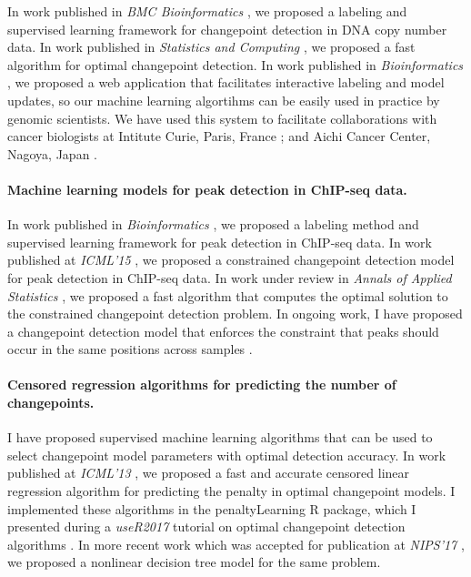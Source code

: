 \documentclass{article}
\begin{document}
In work published in \emph{BMC Bioinformatics}
\citep{HOCKING-breakpoints}, we proposed a labeling and supervised
learning framework for changepoint detection in DNA copy number data.
In work published in \emph{Statistics and Computing} \citep{fpop}, we
proposed a fast algorithm for optimal changepoint detection. In work
published in \emph{Bioinformatics} \citep{hocking-SegAnnDB}, we
proposed a web application that facilitates interactive labeling and
model updates, so our machine learning algortihms can be easily used
in practice by genomic scientists. We have used this system to
facilitate collaborations with cancer biologists at Intitute Curie,
Paris, France \citep{Chicard}; and Aichi Cancer Center, Nagoya, Japan
\citep{Hocking-Leukemia-2016,m14:clonal}.

\paragraph{Machine learning models for peak detection in ChIP-seq data.}

In work published in \emph{Bioinformatics} \citep{HOCKING-chipseq}, we
proposed a labeling method and supervised learning framework for peak
detection in ChIP-seq data. In work published at \emph{ICML'15}
\citep{HOCKING-PeakSeg}, we proposed a constrained changepoint
detection model for peak detection in ChIP-seq data. In work under
review in \emph{Annals of Applied Statistics}
\citep{Hocking-constrained-changepoint-detection}, we proposed a fast
algorithm that computes the optimal solution to the constrained
changepoint detection problem. In ongoing work, I have proposed a
changepoint detection model that enforces the constraint that peaks
should occur in the same positions across samples
\citep{HOCKING-PeakSegJoint}.

\paragraph{Censored regression algorithms for predicting the number of changepoints.}

I have proposed supervised machine learning algorithms that can be
used to select changepoint model parameters with optimal detection
accuracy. In work published at \emph{ICML'13}
\citep{HOCKING-penalties}, we proposed a fast and accurate censored
linear regression algorithm for predicting the penalty in optimal
changepoint models. I implemented these algorithms in the
penaltyLearning R package, which I presented during a \emph{useR2017}
tutorial on optimal changepoint detection algorithms
\citep{change-tutorial}. In more recent work which was accepted for
publication at \emph{NIPS'17} \citep{MMIT}, we proposed a nonlinear
decision tree model for the same problem.
\end{document}
